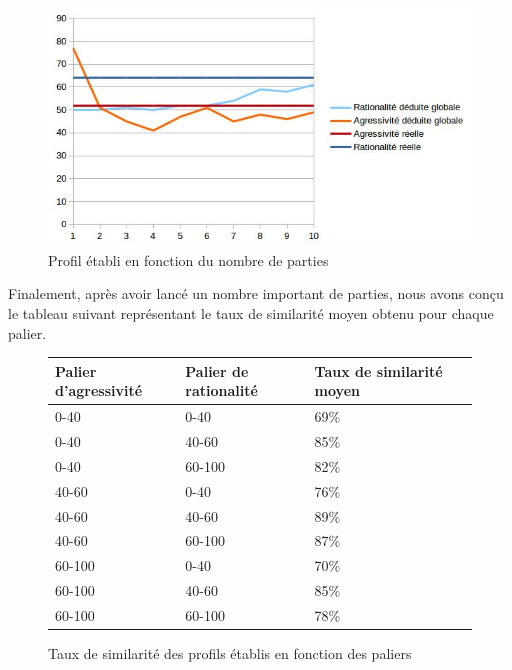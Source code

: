 \documentclass{report}
\begin{document}
\begin{figure}[H]
\begin{center}
	\includegraphics[scale=0.5]{./imagesRapport/profilEtabliEnFonctionPartiesEtReel.jpg}
	\caption{Profil établi en fonction du nombre de parties}
\end{center}
\end{figure}



Finalement, après avoir lancé un nombre important de parties, nous avons conçu le tableau suivant représentant le taux de similarité moyen obtenu pour chaque palier.

\begin{figure}[H]
\begin{center}
\begin{tabular}{|l|l|l|l|}
	\hline
	Palier d'agressivité & Palier de rationalité &	Taux de similarité moyen\\
\hline
0-40	 			    & 0-40 				 & 	69\%\\
\hline
0-40					&	40-60			 &	85\%\\
\hline
0-40					& 60-100				 &	82\%\\
\hline
40-60				&	0-40				 &	76\%\\
\hline
40-60				&	40-60			&	89\%\\
\hline
40-60				&	60-100			&	87\%\\
\hline
60-100				&	0-40				&	70\%\\
\hline
60-100				&	40-60			&	85\%\\
\hline
60-100				&	60-100			&	78\%\\

   \hline
\end{tabular}	
\end{center}
\caption{Taux de similarité des profils établis en fonction des paliers}
\end{figure}
\end{document}
